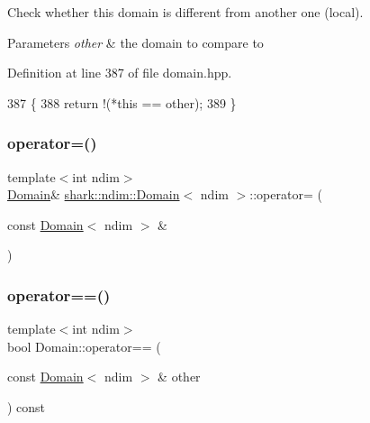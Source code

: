 Check whether this domain is different from another one (local). 
\begin{DoxyParams}{Parameters}
{\em other} & the domain to compare to \\
\hline
\end{DoxyParams}


Definition at line 387 of file domain.\+hpp.


\begin{DoxyCode}
387                                                                             \{
388             \textcolor{keywordflow}{return} !(*\textcolor{keyword}{this} == other);
389         \}
\end{DoxyCode}
\hypertarget{classshark_1_1ndim_1_1_domain_a24484e5bc50ca9907904896eaf20a820}{}\label{classshark_1_1ndim_1_1_domain_a24484e5bc50ca9907904896eaf20a820} 
\subsubsection{\texorpdfstring{operator=()}{operator=()}}
{\footnotesize\ttfamily template$<$int ndim$>$ \\
\hyperlink{classshark_1_1ndim_1_1_domain}{Domain}\& \hyperlink{classshark_1_1ndim_1_1_domain}{shark\+::ndim\+::\+Domain}$<$ ndim $>$\+::operator= (\begin{DoxyParamCaption}\item[{const \hyperlink{classshark_1_1ndim_1_1_domain}{Domain}$<$ ndim $>$ \&}]{ }\end{DoxyParamCaption})\hspace{0.3cm}{\ttfamily [delete]}}

\hypertarget{classshark_1_1ndim_1_1_domain_a8e718f1cacc0c3f82197ac1d5a54d853}{}\label{classshark_1_1ndim_1_1_domain_a8e718f1cacc0c3f82197ac1d5a54d853} 
\subsubsection{\texorpdfstring{operator==()}{operator==()}}
{\footnotesize\ttfamily template$<$int ndim$>$ \\
bool Domain\+::operator== (\begin{DoxyParamCaption}\item[{const \hyperlink{classshark_1_1ndim_1_1_domain}{Domain}$<$ ndim $>$ \&}]{other }\end{DoxyParamCaption}) const}

